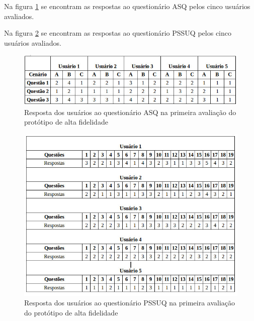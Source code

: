       Na figura \ref{asqalta} se encontram as respostas ao questionário ASQ pelos cinco usuários avaliados.
      
      Na figura \ref{pssuqalta} se encontram as respostas ao questionário PSSUQ pelos cinco usuários avaliados.
      
      \begin{figure}[!htb]
      \centering
      \includegraphics[scale=0.6]{figuras/asqalta.jpg}
      \caption{Resposta dos usuários ao questionário ASQ na primeira avaliação do protótipo de alta fidelidade}
      \label{asqalta}
      \end{figure}
      
      
      \begin{figure}[!htb]
      \centering
      \includegraphics[scale=0.6]{figuras/pssuqalta.jpg}
      \caption{Resposta dos usuários ao questionário PSSUQ na primeira avaliação do protótipo de alta fidelidade}
      \label{pssuqalta}
      \end{figure}
